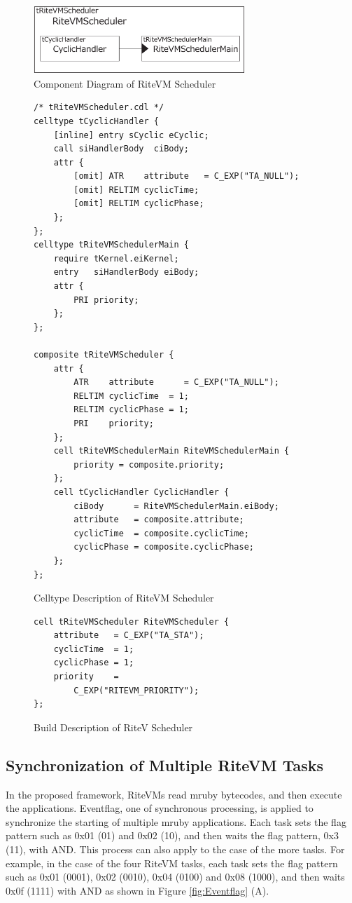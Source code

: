 \documentclass{sig-alternate-05-2015}
\begin{document}
\begin{figure}[t]
    \centering
    \includegraphics[width=8cm,clip]{figure/cyclic_handler.eps}
    \caption{Component Diagram of RiteVM Scheduler}
    \label{fig:cyclic_handler}
\end{figure}
\begin{figure}[t]
    \centering
    \begin{lstlisting}
/* tRiteVMScheduler.cdl */
celltype tCyclicHandler {
    [inline] entry sCyclic eCyclic;
    call siHandlerBody  ciBody;
    attr {
        [omit] ATR    attribute   = C_EXP("TA_NULL");
    	[omit] RELTIM cyclicTime;
    	[omit] RELTIM cyclicPhase;
    };
};
celltype tRiteVMSchedulerMain {
    require tKernel.eiKernel;
    entry   siHandlerBody eiBody;
    attr {
        PRI priority;
    };
};

composite tRiteVMScheduler {
    attr {
        ATR    attribute      = C_EXP("TA_NULL");
        RELTIM cyclicTime  = 1;
        RELTIM cyclicPhase = 1;
        PRI    priority;
    };
    cell tRiteVMSchedulerMain RiteVMSchedulerMain {
        priority = composite.priority;
    };
    cell tCyclicHandler CyclicHandler {
        ciBody      = RiteVMSchedulerMain.eiBody;
        attribute   = composite.attribute;
        cyclicTime  = composite.cyclicTime;
        cyclicPhase = composite.cyclicPhase;
    };
};
    \end{lstlisting}
    \caption{Celltype Description of RiteVM Scheduler}
    \label{celltype_cyclic_handler}
\end{figure}
\begin{figure}[t]
    \centering
    \begin{lstlisting}
cell tRiteVMScheduler RiteVMScheduler {
    attribute   = C_EXP("TA_STA");
    cyclicTime  = 1;
    cyclicPhase = 1;
    priority    =
        C_EXP("RITEVM_PRIORITY");
};
\end{lstlisting}
    \caption{Build Description of RiteV Scheduler}
    \label{build_cyclic_handler}
\end{figure}
 
\subsection{Synchronization of Multiple RiteVM Tasks}
In the proposed framework, RiteVMs read mruby bytecodes, and then execute the applications.
Eventflag, one of synchronous processing, is applied to synchronize the starting of multiple mruby applications.
Each task sets the flag pattern such as 0x01 (01) and 0x02 (10), and then waits the flag pattern, 0x3 (11), with AND.
This process can also apply to the case of the more tasks.
For example, in the case of the four RiteVM tasks, each task sets the flag pattern such as 0x01 (0001), 0x02 (0010), 0x04 (0100)  and 0x08 (1000), and then waits 0x0f (1111) with AND as shown in Figure \ref{fig:Eventflag} (A).
\end{document}
